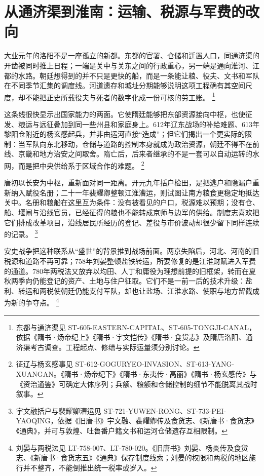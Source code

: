 \section{从通济渠到淮南：运输、税源与军费的改向}
\label{sec:transport-fiscal-transition}

大业元年的洛阳不是一座孤立的新都。东都的官署、仓储和迁置人口，同通济渠的开凿被同时推上日程；一端是关中与关东之间的行政重心，另一端是通向淮河、江都的水路。朝廷想得到的并不只是更快的船，而是一条能让粮、役夫、文书和军队在不同季节汇集的调度线。河道遗存和城址分期能够说明这项工程确有其空间尺度，却不能把正史所载役夫与死者的数字化成一份可核的劳工账。%
\footnote{东都与通济渠见 ST-605-EASTERN-CAPITAL、ST-605-TONGJI-CANAL，依据《隋书·炀帝纪上》《隋书·宇文恺传》《隋书·食货志》及隋唐洛阳、通济渠考古调查。工程起点、修缮与实际运量须分别讨论。}

这条线很快显示出国家能力的两面。它使隋廷能够把东部资源接向中枢，也使征发、粮运与远征叠加到同一些州县和家庭身上。612年辽东战场的补给难题、613年黎阳仓附近的杨玄感起兵，并非由运河直接“造成”；但它们揭出一个更实际的限制：当军队向东北移动，仓储与道路的控制本身就成为政治资源，朝廷不得不在前线、京畿和地方治安之间取舍。隋亡后，后来者继承的不是一套可以自动运转的水网，而是把中央供给系于区域合作的难题。%
\footnote{征辽与杨玄感事见 ST-612-GOGURYEO-INVASION、ST-613-YANG-XUANGAN。《隋书·炀帝纪下》《隋书·东夷传·高丽》《隋书·杨玄感传》与《资治通鉴》可确定大体序列；兵额、粮额和仓储控制的细节不能脱离其战时叙事。}

唐初以长安为中枢，重新面对同一距离。开元九年括户检田，是把逃户和隐漏户重新纳入赋役名册；二十一年裴耀卿整顿江淮漕运，则试图让南方粮食更稳定地抵达关中。名册和粮船在这里互为条件：没有被看见的户口，税源难以预期；没有仓、船、堰闸与沿线官员，已经征得的粮也不能转成京师与边军的供给。制度志喜欢把它们排成改革项目，沿线居民所经历的登记、差役与市价波动却很少留下同样连续的记录。%
\footnote{宇文融括户与裴耀卿漕运见 ST-721-YUWEN-RONG、ST-733-PEI-YAOQING，依据《旧唐书》宇文融、裴耀卿传及食货志、《新唐书·食货志》《通典》，并可与敦煌、吐鲁番户籍文书和运河仓储遗存互相限制。}

安史战争把这种联系从“盛世”的背景推到战场前面。两京失陷后，河北、河南的旧税源和道路不再可靠；758年刘晏整顿盐铁转运，所要修复的是江淮财赋进入军费的通道。780年两税法又放弃以均田、人丁和庸役为理想前提的旧框架，转而在夏秋两季向仍能登记的资产、土地与住户征取。它们不是一前一后的技术升级：盐利、转运和两税使朝廷仍能支付军队，却也让盐场、江淮水路、使职与地方留截成为新的争夺点。%
\footnote{刘晏与两税法见 LT-758-007、LT-780-020。《旧唐书》刘晏、杨炎传及食货志、《新唐书·食货志五》《通典》保存制度线索；刘晏的权限和两税的地区施行并不整齐，不能倒推出统一税率或岁入。}

